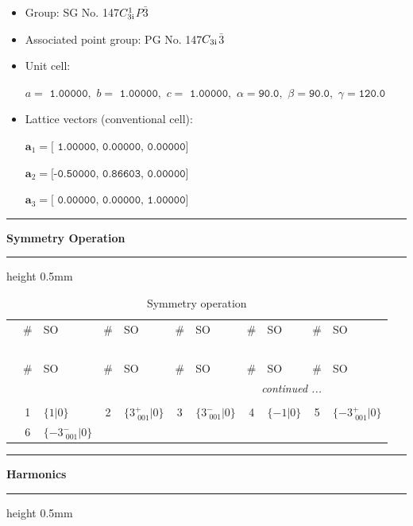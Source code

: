 \documentclass[fleqn,10pt,landscape]{jsarticle}
\begin{document}
\begin{itemize}
\item Group: SG No. 147\quad$C_{\rm 3i}^{1}$\quad$P\bar{3}$\quad[ trigonal ]
\item Associated point group: PG No. 147\quad$C_{\rm 3i}$\quad$\bar{3}$\quad[ trigonal ]
\end{itemize}
\begin{itemize}
\item Unit cell:

\quad $a=\texttt{ 1.00000},\,\, b=\texttt{ 1.00000},\,\, c=\texttt{ 1.00000},\,\, \alpha=\texttt{90.0},\,\, \beta=\texttt{90.0},\,\, \gamma=\texttt{120.0}$

\item Lattice vectors (conventional cell):

\quad $\bm{a}_1=\texttt{[ 1.00000, 0.00000, 0.00000]}$

\quad $\bm{a}_2=\texttt{[-0.50000, 0.86603, 0.00000]}$

\quad $\bm{a}_3=\texttt{[ 0.00000, 0.00000, 1.00000]}$

\end{itemize}
\vspace{5mm}
\noindent \rule[0.5mm]{5mm}{0.5mm}\hspace{3mm}\textbf{Symmetry Operation}\hspace{3mm}\leaders\hrule height 0.5mm\hfill\kern0pt
\vspace{3mm}

\renewcommand{\arraystretch}{1.6}
\begin{longtable}[l]{c|cl|cl|cl|cl|cl}
\captionsetup{justification=raggedright, singlelinecheck=off}
\caption{Symmetry operation}
 \\
 \hline \hline
 & \# & SO & \# & SO & \# & SO & \# & SO & \# & SO \\ \hline \endfirsthead

\multicolumn{10}{l}{\tablename\ \thetable{}} \\
 \hline \hline
 & \# & SO & \# & SO & \# & SO & \# & SO & \# & SO \\ \hline \endhead

 \hline \hline
\multicolumn{10}{r}{\footnotesize\it continued ...} \\ \endfoot

 \hline \hline
\multicolumn{10}{r}{} \\ \endlastfoot

 & 1 & $\{1|0\}$ & 2 & $\{3^{+}_{\,\,001}|0\}$ & 3 & $\{3^{-}_{\,\,001}|0\}$ & 4 & $\{-1|0\}$ & 5 & $\{-3^{+}_{\,\,001}|0\}$ \\
& 6 & $\{-3^{-}_{\,\,001}|0\}$ &  &  &  &  &  &  &  &  \\
\end{longtable}
\vspace{5mm}
\noindent \rule[0.5mm]{5mm}{0.5mm}\hspace{3mm}\textbf{Harmonics}\hspace{3mm}\leaders\hrule height 0.5mm\hfill\kern0pt
\vspace{3mm}
\end{document}
